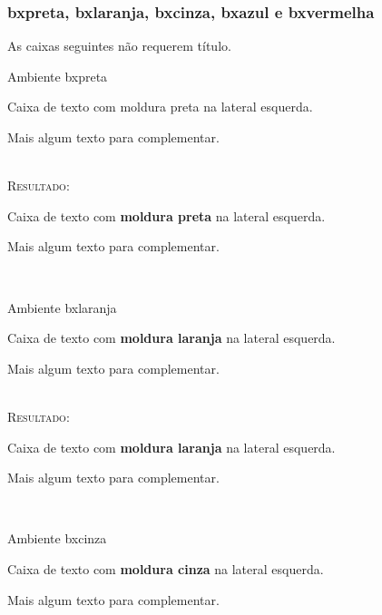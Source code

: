 \subsubsection{bxpreta, bxlaranja, bxcinza, bxazul e bxvermelha}

As caixas seguintes não requerem título.

\begin{codex}{Ambiente bxpreta}
	\begin{bxpreta}
	Caixa de texto com moldura preta na lateral esquerda. 
	
	Mais algum texto para complementar.   
	\end{bxpreta} 
\end{codex}
\ \\

\textsc{Resultado:}
\ \\

\begin{bxpreta}
	Caixa de texto com \textbf{moldura preta} na lateral esquerda. 
	
	Mais algum texto para complementar.     
\end{bxpreta} 
\ \\

\begin{codex}{Ambiente bxlaranja}
	\begin{bxlaranja}
	Caixa de texto com \textbf{moldura laranja} na lateral esquerda.  
	
	Mais algum texto para complementar.  
	\end{bxlaranja}
\end{codex}
\ \\

\textsc{Resultado:}
\ \\

\begin{bxlaranja}
	Caixa de texto com \textbf{moldura laranja} na lateral esquerda.
	
	Mais algum texto para complementar.   
\end{bxlaranja}
\ \\

\begin{codex}{Ambiente bxcinza}
	\begin{bxcinza}
	Caixa de texto com \textbf{moldura cinza} na lateral esquerda. 
	
	Mais algum texto para complementar.  
	\end{bxcinza}
\end{codex}
\ \\ 

